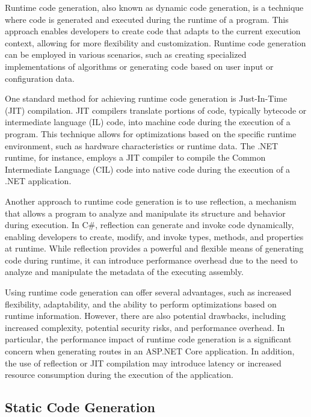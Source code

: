 Runtime code generation, also known as dynamic code generation, is a technique where code is generated and executed during the runtime of a program. This approach enables developers to create code that adapts to the current execution context, allowing for more flexibility and customization. Runtime code generation can be employed in various scenarios, such as creating specialized implementations of algorithms or generating code based on user input or configuration data\cite{Chiba1995, Aycock2003}.

One standard method for achieving runtime code generation is Just-In-Time (JIT) compilation. JIT compilers translate portions of code, typically bytecode or intermediate language (IL) code, into machine code during the execution of a program\cite{Aycock2003}. This technique allows for optimizations based on the specific runtime environment, such as hardware characteristics or runtime data\cite{Gal2006}. The .NET runtime, for instance, employs a JIT compiler to compile the Common Intermediate Language (CIL) code into native code during the execution of a .NET application\cite{Esposito2014}.

Another approach to runtime code generation is to use reflection, a mechanism that allows a program to analyze and manipulate its structure and behavior during execution\cite{Maes1987}. In C\#, reflection can generate and invoke code dynamically, enabling developers to create, modify, and invoke types, methods, and properties at runtime\cite{Albahari2019}. While reflection provides a powerful and flexible means of generating code during runtime, it can introduce performance overhead due to the need to analyze and manipulate the metadata of the executing assembly\cite{Skeet2019}.

Using runtime code generation can offer several advantages, such as increased flexibility, adaptability, and the ability to perform optimizations based on runtime information\cite{Chiba1995, Aycock2003}. However, there are also potential drawbacks, including increased complexity, potential security risks, and performance overhead\cite{Aycock2003, Pobar2005}. In particular, the performance impact of runtime code generation is a significant concern when generating routes in an ASP.NET Core application. In addition, the use of reflection or JIT compilation may introduce latency or increased resource consumption during the execution of the application\cite{Pobar2005}.

\subsection{Static Code Generation}

